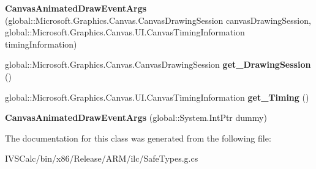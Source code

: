\begin{DoxyCompactItemize}
{\bfseries Canvas\+Animated\+Draw\+Event\+Args} (global\+::\+Microsoft.\+Graphics.\+Canvas.\+Canvas\+Drawing\+Session canvas\+Drawing\+Session, global\+::\+Microsoft.\+Graphics.\+Canvas.\+U\+I.\+Canvas\+Timing\+Information timing\+Information)
\item 
\mbox{\label{class_microsoft_1_1_graphics_1_1_canvas_1_1_u_i_1_1_xaml_1_1_canvas_animated_draw_event_args_abbbe03755eef9ce5bdf4d9c05a8f521d}} 
global\+::\+Microsoft.\+Graphics.\+Canvas.\+Canvas\+Drawing\+Session {\bfseries get\+\_\+\+Drawing\+Session} ()
\item 
\mbox{\label{class_microsoft_1_1_graphics_1_1_canvas_1_1_u_i_1_1_xaml_1_1_canvas_animated_draw_event_args_a22d34a76080b643c84026f8d7acaf7dc}} 
global\+::\+Microsoft.\+Graphics.\+Canvas.\+U\+I.\+Canvas\+Timing\+Information {\bfseries get\+\_\+\+Timing} ()
\item 
\mbox{\label{class_microsoft_1_1_graphics_1_1_canvas_1_1_u_i_1_1_xaml_1_1_canvas_animated_draw_event_args_abfa7204a8fa459825847e3dc689bea45}} 
{\bfseries Canvas\+Animated\+Draw\+Event\+Args} (global\+::\+System.\+Int\+Ptr dummy)
\end{DoxyCompactItemize}


The documentation for this class was generated from the following file\+:\begin{DoxyCompactItemize}
\item 
I\+V\+S\+Calc/bin/x86/\+Release/\+A\+R\+M/ilc/Safe\+Types.\+g.\+cs\end{DoxyCompactItemize}
